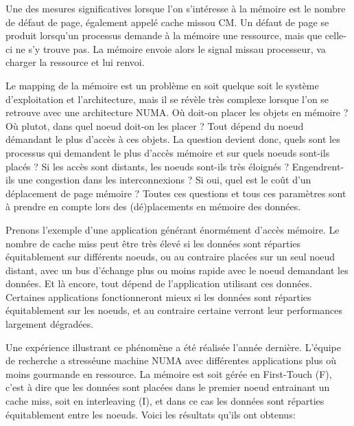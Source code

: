     Une des mesures significatives lorsque l'on s'intéresse à la mémoire est le
    nombre de défaut de page, également appelé \og cache miss\fg ou \og CM\fg. Un
    défaut de page se produit lorsqu'un processus demande à la mémoire une
    ressource, mais que celle-ci ne s'y trouve pas. La mémoire envoie alors le signal
    \og miss\fg au processeur, va charger la ressource et lui renvoi.

    Le mapping de la mémoire est un problème en soit quelque soit le système
    d'exploitation et l'architecture, mais il se révèle très complexe lorsque
    l'on se retrouve avec une architecture NUMA. Où doit-on placer les objets en
    mémoire ? Où plutot, dans quel noeud doit-on les placer ? Tout dépend du
    noeud démandant le plus d'accès à ces objets. La question devient donc,
    quels sont les processus qui demandent le plus d'accès mémoire et sur quels
    noeuds sont-ils placés ? Si les accès sont distants, les noeuds sont-ils
    très éloignés ? Engendrent-ils une congestion dans les interconnexions ? Si
    oui, quel est le coût d'un déplacement de page mémoire ?  Toutes ces
    questions et tous ces paramètres sont à prendre en compte lors des
    (dé)placements en mémoire des données.

    Prenons l'exemple d'une application générant énormément d'accès mémoire. Le
    nombre de cache miss peut être très élevé si les données sont réparties
    équitablement sur différents noeuds, ou au contraire placées sur un seul
    noeud distant, avec un bus d'échange plus ou moins rapide avec le noeud
    demandant les données. Et là encore, tout dépend de l'application utilisant
    ces données. Certaines applications fonctionneront mieux si les données sont
    réparties équitablement sur les noeuds, et au contraire certaine verront
    leur performances largement dégradées.

    Une expérience illustrant ce phénomène a été réalisée l'année
    dernière\cite{Holistic2013}. L'équipe de recherche a \og stressé\fg une
    machine NUMA avec différentes applications plus où moins gourmande en
    ressource. La mémoire est soit gérée en \og First-Touch (F)\fg, c'est à dire
    que les données sont placées dans le premier noeud entrainant un cache miss,
    soit en \og interleaving (I)\fg, et dans ce cas les données sont réparties
    équitablement entre les noeuds. Voici les résultats qu'ils ont obtenus:

